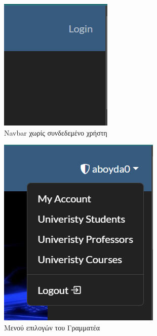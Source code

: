 \documentclass[12pt]{article}
\begin{document}
\begin{figure}[H]
	\centering
	\begin{subfigure}{.35\textwidth}
		\centering
		\includegraphics[width=.7\linewidth]{b0.png}
		\caption{Navbar χωρίς συνδεδεμένο χρήστη}
		\label{fig:sub21}
	\end{subfigure}%
	\begin{subfigure}{.35\textwidth}
		\centering
		\includegraphics[width=.7\linewidth]{b1.png}
		\caption{Μενού επιλογών του Γραμματέα}
		\label{fig:sub22}
	\end{subfigure}
	\caption{}
	\label{fig:test1}
\end{figure}
\end{document}
